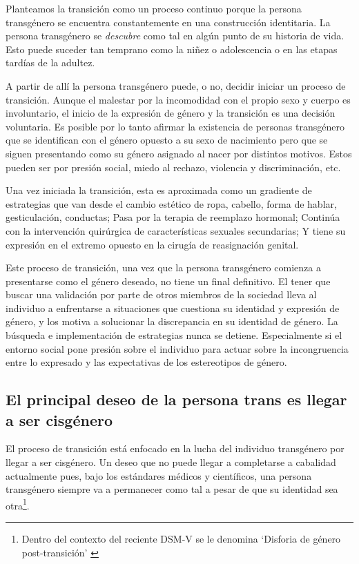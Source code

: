 Planteamos la transición como un proceso continuo porque la persona transgénero
se encuentra constantemente en una construcción identitaria. La persona
transgénero se \emph{descubre} como tal en algún punto de su historia de vida.
Esto puede suceder tan temprano como la niñez o adolescencia o en las etapas
tardías de la adultez.

A partir de allí la persona transgénero puede, o no, decidir iniciar un proceso
de transición. Aunque el malestar por la incomodidad con el propio sexo y cuerpo
es involuntario, el inicio de la expresión de género y la transición es una
decisión voluntaria. Es posible por lo tanto afirmar la existencia de personas
transgénero que se identifican con el género opuesto a su sexo de nacimiento
pero que se siguen presentando como su género asignado al nacer por distintos
motivos. Estos pueden ser por presión social, miedo al rechazo, violencia y
discriminación, etc.

Una vez iniciada la transición, esta es aproximada como un gradiente de
estrategias que van desde el cambio estético de ropa, cabello, forma de hablar,
gesticulación, conductas; Pasa por la terapia de reemplazo hormonal; Continúa
con la intervención quirúrgica de características sexuales secundarias; Y tiene
su expresión en el extremo opuesto en la cirugía de reasignación genital.

Este proceso de transición, una vez que la persona transgénero comienza a
presentarse como el género deseado, no tiene un final definitivo. El tener que
buscar una validación por parte de otros miembros de la sociedad lleva al
individuo a enfrentarse a situaciones que cuestiona su identidad y expresión de
género, y los motiva a solucionar la discrepancia en su identidad de género. La
búsqueda e implementación de estrategias nunca se detiene. Especialmente si el
entorno social pone presión sobre el individuo para actuar sobre la
incongruencia entre lo expresado y las expectativas de los estereotipos de
género.

\subsection{El principal deseo de la persona trans es llegar a ser cisgénero}

El proceso de transición está enfocado en la lucha del individuo
transgénero por llegar a ser cisgénero. Un deseo que no puede llegar a
completarse a cabalidad actualmente pues, bajo los estándares médicos y
científicos, una persona transgénero siempre va a permanecer como tal a pesar de
que su identidad sea otra\footnote{Dentro del contexto del reciente DSM-V se le
denomina ‘Disforia de género post-transición’ \parencite[p. 453]{APA2016}}.

